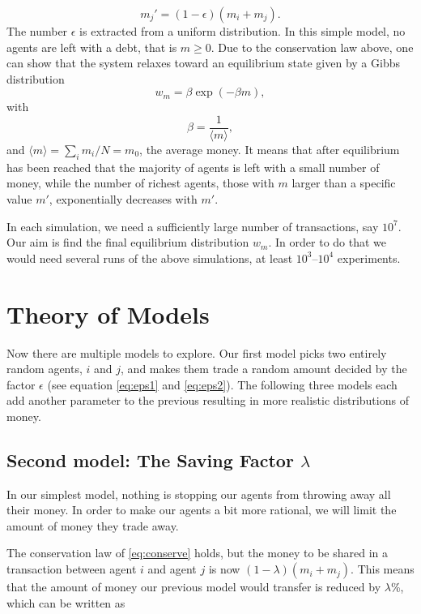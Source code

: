 \documentclass[12pt,a4paper]{article}
\begin{document}
\begin{equation}
  m_j'= (1-\epsilon)(m_i+m_j). \label{eq:eps2}
\end{equation}
The number $\epsilon$ is extracted from a uniform distribution.
In this simple model, no agents are left with a debt, that is $m\ge 0$.
Due to the conservation law above, one can show that the system relaxes toward an equilibrium
state given by a Gibbs distribution
\begin{equation*}
  w_m=\beta \exp{(-\beta m)},
\end{equation*}
with
\begin{equation*}
  \beta = \frac{1}{\langle m\rangle},
\end{equation*}
and $\langle m\rangle=\sum_i m_i/N=m_0$, the average money.
It means that after equilibrium has been reached that the majority of agents is left with a small
number of money, while the number of richest agents, those with $m$ larger than a specific value $m'$,
exponentially decreases with $m'$.

In each simulation, we need a sufficiently large number of transactions, say $10^7$. Our aim is find the final equilibrium distribution $w_m$. In order to do that we would need
several runs of the above simulations, at least $10^3$--$10^4$ experiments.

\section{Theory of Models}

Now there are multiple models to explore. Our first model picks two entirely random agents, $i$ and $j$, and makes them trade a random amount decided by the factor $\epsilon$ (see equation \eqref{eq:eps1} and \eqref{eq:eps2}).
The following three models each add another parameter to the previous resulting in more realistic distributions of money.

\subsection{Second model: The Saving Factor $\lambda$} \label{sec:model2}
In our simplest model, nothing is stopping our agents from throwing away all their money. In order to make our agents a bit more rational, we will limit the amount of money they trade away.

The conservation law of \eqref{eq:conserve} holds, but the money to be shared in a transaction between
agent $i$ and agent $j$ is now $(1-\lambda)(m_i+m_j)$. This means that the amount of money our previous model would transfer is reduced by $\lambda$\%, which can be written as
\end{document}
